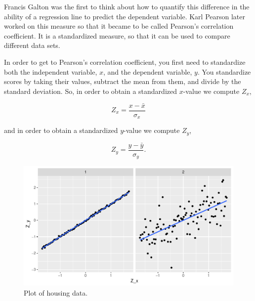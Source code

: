 \documentclass[]{report}\usepackage[]{graphicx}\usepackage[]{color}
\makeatletter
\def\maxwidth{ %
  \ifdim\Gin@nat@width>\linewidth
    \linewidth
  \else
    \Gin@nat@width
  \fi
}
\newenvironment{knitrout}{}{} %
\makeatother
\begin{document}
Francis Galton was the first to think about how to quantify this difference in the ability of a regression line to predict the dependent variable. Karl Pearson later worked on this measure so that it became to be called Pearson's correlation coefficient. It is a standardized measure, so that it can be used to compare different data sets.

In order to get to Pearson's correlation coefficient, you first need to standardize both the independent variable, $x$, and the dependent variable, $y$. You standardize scores by taking their values, subtract the mean from them, and divide by the standard deviation. So, in order to obtain a standardized $x$-value we compute $Z_x$,

\begin{equation}
Z_x = \frac{x- \bar{x}}{\sigma_x}
\end{equation}

and in order to obtain a standardized $y$-value we compute $Z_y$,

\begin{equation}
Z_y = \frac{y- \bar{y}}{\sigma_y}.
\end{equation}



\begin{knitrout}
\color{fgcolor}\begin{figure}

{\centering \includegraphics[width=\maxwidth]{figure/lm_19-1} 

}

\caption[Plot of housing data]{Plot of housing data.}\label{fig:lm_19}
\end{figure}


\end{knitrout}
\end{document}
